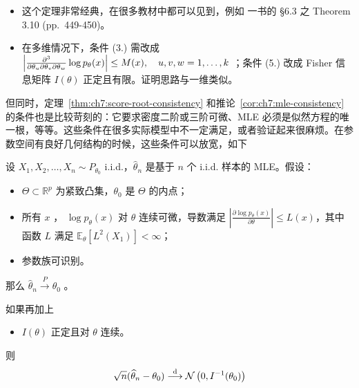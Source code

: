 \begin{remark}

\begin{itemize}
\tightlist
\item
  这个定理非常经典，在很多教材中都可以见到，例如 \cite{lehmanncasella1998} 一书的 §6.3 之 Theorem 3.10 (pp.~449-450)。
\item
  在多维情况下，条件 (3.) 需改成 $\Bigl|\frac{\partial^3}{\partial\theta_u\partial\theta_v\partial\theta_w}\log p_\theta(x)\Bigr|\le M(x),\quad u,v,w=1,\dots,k$ ；条件 (5.) 改成 Fisher 信息矩阵 $I(\theta)$ 正定且有限。证明思路与一维类似。
\end{itemize}
\end{remark}

但同时，定理~\ref{thm:ch7:score-root-consistency} 和推论~\ref{cor:ch7:mle-consistency} 的条件也是比较苛刻的：它要求密度二阶或三阶可微、MLE 必须是似然方程的唯一根，等等。这些条件在很多实际模型中不一定满足，或者验证起来很麻烦。在参数空间有良好几何结构的时候，这些条件可以放宽，如下

\begin{theorem*}

设 $X_1,X_2,\dots,X_n \sim P_{\theta_0}$ i.i.d.，$\widehat{\theta}_n$ 是基于 $n$ 个 i.i.d. 样本的 MLE。假设：

\begin{itemize}
\tightlist
\item
  $\Theta \subset \mathbb{R}^p$ 为紧致凸集，$\theta_0$ 是 $\Theta$ 的内点；
\item
  所有 $x$ ， $\log p_\theta(x)$ 对 $\theta$ 连续可微，导数满足 $\left|\tfrac{\partial \log p_\theta(x)}{\partial \theta}\right| \le L(x)$，其中函数 $L$ 满足 $\mathbb{E}_\theta[L^2(X_1)] < \infty$；
\item
  参数族可识别。
\end{itemize}

那么 $\widehat\theta_n\overset{P}\to \theta_0$ 。

如果再加上

\begin{itemize}
\tightlist
\item
  $I(\theta)$ 正定且对 $\theta$ 连续。
\end{itemize}

则
\[\sqrt{n}(\widehat{\theta}_n - \theta_0) \overset{\rm d}\longrightarrow \mathcal{N}\left(0, I^{-1}(\theta_0)\right)\]




\end{theorem*}

